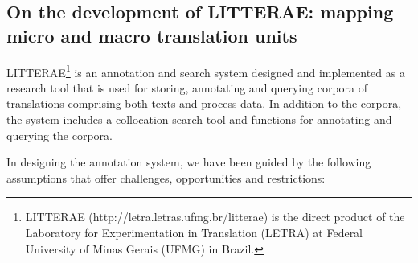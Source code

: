 \documentclass[output=paper]{LSP/langsci}
\begin{document}
\subsection{On the development of LITTERAE: mapping micro and macro translation units}\label{sec:alves:2.3}

LITTERAE\footnote{LITTERAE (http://letra.letras.ufmg.br/litterae) is the direct product of the Laboratory for Experimentation in Translation (LETRA) at Federal University of Minas Gerais (UFMG) in Brazil.} is an annotation and search system designed and implemented as a research tool that is used for storing, annotating and querying corpora of translations comprising both texts and process data. In addition to the corpora, the system includes a collocation search tool and functions for annotating and querying the corpora.

In designing the annotation system, we have been guided by the following assumptions that offer challenges, opportunities and restrictions:
\end{document}
